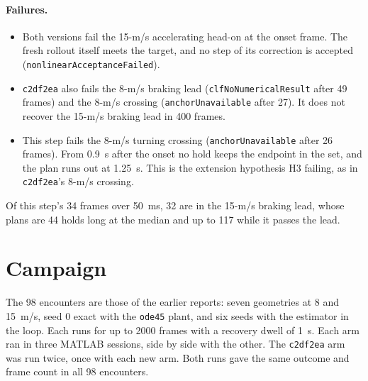 \documentclass[11pt]{article}
\begin{document}
\paragraph{Failures.}
\begin{itemize}
\item Both versions fail the 15-m/s accelerating head-on at the onset
  frame. The fresh rollout itself meets the target, and no step of its
  correction is accepted (\texttt{nonlinearAcceptanceFailed}).
\item \texttt{c2df2ea} also fails the 8-m/s braking lead
  (\texttt{clfNoNumericalResult} after 49 frames) and the 8-m/s crossing
  (\texttt{anchorUnavailable} after 27). It does not recover the 15-m/s
  braking lead in 400 frames.
\item This step fails the 8-m/s turning crossing (\texttt{anchorUnavailable}
  after 26 frames). From 0.9~s after the onset no hold keeps the endpoint
  in the set, and the plan runs out at 1.25~s. This is the extension
  hypothesis H3 failing, as in \texttt{c2df2ea}'s 8-m/s crossing.
\end{itemize}
Of this step's 34 frames over 50~ms, 32 are in the 15-m/s braking lead,
whose plans are 44 holds long at the median and up to 117 while it passes
the lead.

\section{Campaign}
The 98 encounters are those of the earlier reports: seven geometries at 8
and 15~m/s, seed 0 exact with the \texttt{ode45} plant, and six seeds with
the estimator in the loop. Each runs for up to 2000 frames with a recovery
dwell of 1~s. Each arm ran in three MATLAB sessions, side by side with the
other. The \texttt{c2df2ea} arm was run twice, once with each new arm. Both
runs gave the same outcome and frame count in all 98 encounters.
\end{document}
